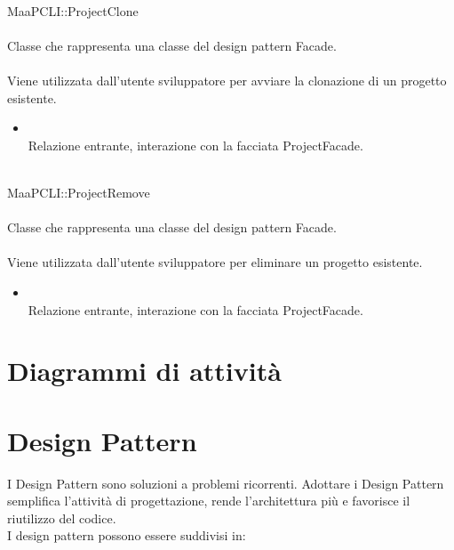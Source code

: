 \\
MaaPCLI::ProjectClone\\
\\
Classe che rappresenta una classe del design pattern Facade.\\
\\
Viene utilizzata dall'utente sviluppatore per avviare la clonazione di un progetto esistente.\\
\begin{itemize}
\item{}\\
Relazione entrante, interazione con la facciata ProjectFacade.
\end{itemize}

\\
MaaPCLI::ProjectRemove\\
\\
Classe che rappresenta una classe del design pattern Facade.\\
\\
Viene utilizzata dall'utente sviluppatore per eliminare un progetto esistente.\\
\begin{itemize}
\item{}\\
Relazione entrante, interazione con la facciata ProjectFacade.
\end{itemize}


\newpage
\section{Diagrammi di attività}
\label{attivita}




\newpage
\section{Design Pattern}
I Design Pattern sono soluzioni a problemi ricorrenti. Adottare i Design Pattern semplifica l'attività di progettazione, rende l'architettura più  e favorisce il riutilizzo del codice.\\
I design pattern possono essere suddivisi in:

